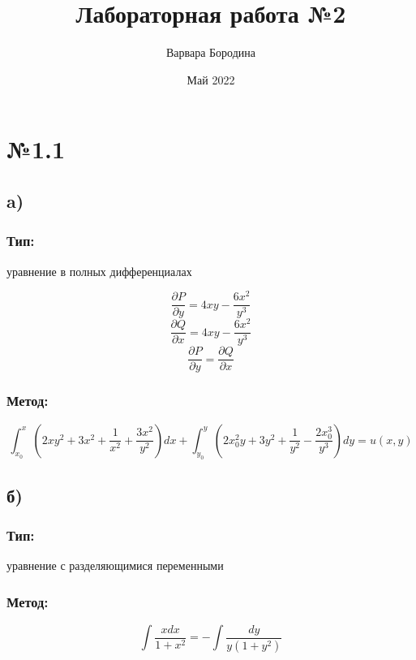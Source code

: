 \documentclass{article}
\title{Лабораторная работа №2}
\author{Варвара Бородина}
\date{Май 2022}
\begin{document}
\maketitle

\section*{№1.1}
\subsection*{a)}
\subsubsection*{Тип:} 
уравнение в полных дифференциалах

\begin{equation*}
\frac{\partial P}{\partial y}=4xy-\frac{6x^2}{y^3}
\end{equation*}
\begin{equation*}
\frac{\partial Q}{\partial x}=4xy-\frac{6x^2}{y^3}
\end{equation*}
\begin{equation*}
\frac{\partial P}{\partial y}=\frac{\partial Q}{\partial x}
\end{equation*}

\subsubsection*{Метод:}
\begin{equation*}
\int_{x_0}^{x}\left(2xy^2+3x^2+\frac{1}{x^2}+\frac{3x^2}{y^2}\right)dx+\int_{y_0}^{y}\left(2x_0^2y+3y^2+\frac{1}{y^2}-\frac{2x_0^3}{y^3}\right)dy=u(x,y)
\end{equation*}

\subsection*{б)}
\subsubsection*{Тип:} 
уравнение с разделяющимися переменными

\subsubsection*{Метод:}
\begin{equation*}
\int \frac{xdx}{1+x^2}=-\int \frac{dy}{y(1+y^2)}
\end{equation*}
\end{document}
